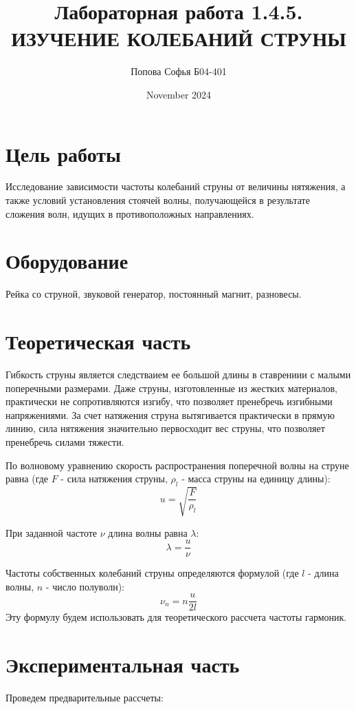 \documentclass{article}
\title{\textbf{Лабораторная работа 1.4.5.} \linebreak
ИЗУЧЕНИЕ КОЛЕБАНИЙ СТРУНЫ}
\author{Попова Софья Б04-401}
\date{November 2024}
\begin{document}
\maketitle

\section*{Цель работы}
Исследование зависимости частоты колебаний струны от величины нятяжения, а также условий установления стоячей волны, получающейся в результате сложения волн, идущих в противоположных направлениях.

\section*{Оборудование}
Рейка со струной, звуковой генератор, постоянный магнит, разновесы.

\section*{Теоретическая часть}
Гибкость струны является следстваием ее большой длины в ставрениии с малыми поперечными размерами. Даже струны, изготовленные из жестких материалов, практически не сопротивляются изгибу, что позволяет пренебречь изгибными напряжениями. За счет натяжения струна вытягивается практически в прямую линию, сила нятяжения значительно первосходит вес струны, что позволяет пренебречь силами тяжести.

По волновому уравнению скорость распространения поперечной волны на струне равна (где $F$ - сила натяжения струны, $\rho_l$ - масса струны на единицу длины):
\begin{equation}
    u =\sqrt{\frac{F}{\rho_l}}
\end{equation}

При заданной частоте $\nu$ длина волны равна $\lambda$:
\begin{equation}
    \lambda = \frac{u}{\nu}
\end{equation}

Частоты собственных колебаний струны определяются формулой (где $l$ - длина волны, $n$ - число полуволн):
\begin{equation}
    \nu_n=n\frac{u}{2l}
\end{equation}
Эту формулу будем использовать для теоретического рассчета частоты гармоник.

\newpage

\section*{Экспериментальная часть}
Проведем предварительные рассчеты:
\end{document}

